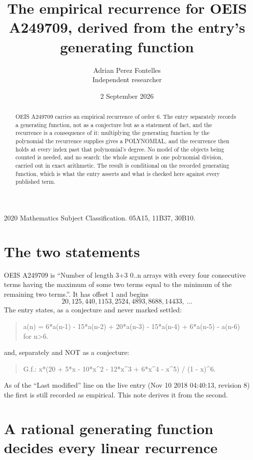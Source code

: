 \documentclass[11pt,a4paper]{article}
\title{The empirical recurrence for OEIS A249709, derived from the entry's generating function}
\author{Adrian Perez Fontelles\\ \small Independent researcher}
\date{2 September 2026}
\theoremstyle{plain}
\theoremstyle{definition}
\begin{document}
\maketitle

\begin{abstract}
OEIS A249709 carries an empirical recurrence of order $6$. The entry separately records a
generating function, not as a conjecture but as a statement of fact, and the recurrence is a
consequence of it: multiplying the generating function by the polynomial the recurrence
supplies gives a POLYNOMIAL, and the recurrence then holds at every index past that
polynomial's degree. No model of the objects being counted is needed, and no search: the
whole argument is one polynomial division, carried out in exact arithmetic. The result is
conditional on the recorded generating function, which is what the entry asserts and what is
checked here against every published term.
\end{abstract}

\noindent\small 2020 Mathematics Subject Classification. 05A15, 11B37, 30B10.\normalsize

\section{The two statements}

OEIS A249709 is ``Number of length 3+3 0..n arrays with every four consecutive terms having the maximum of some two terms equal to the minimum of the remaining two terms.''. It has offset $1$ and begins
\[
20, 125, 440, 1153, 2524, 4893, 8688, 14433,\ \dots
\]
The entry states, as a conjecture and never marked settled:
\begin{quote}
a(n) = 6*a(n-1) - 15*a(n-2) + 20*a(n-3) - 15*a(n-4) + 6*a(n-5) - a(n-6) for n>6.
\end{quote}
and, separately and NOT as a conjecture:
\begin{quote}
G.f.: x*(20 + 5*x - 10*x\^{}2 - 12*x\^{}3 + 6*x\^{}4 - x\^{}5) / (1 - x)\^{}6.
\end{quote}
As of the ``Last modified'' line on the live entry (Nov 10 2018 04:40:13, revision 8) the first is still
recorded as empirical. This note derives it from the second.

\section{A rational generating function decides every linear recurrence}
\end{document}
